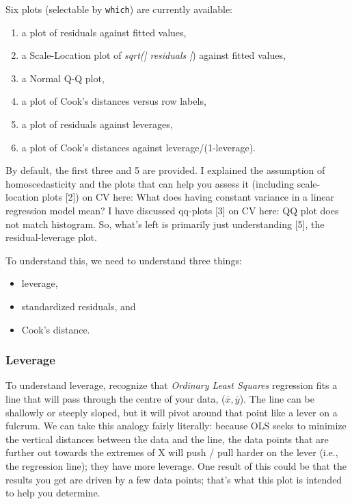 \documentclass[12pt, a4paper]{article}
\theoremstyle{plain}
\theoremstyle{definition}
\theoremstyle{remark}
\begin{document}
Six plots (selectable by \texttt{which}) are currently available: 
\begin{enumerate}
\item a plot of residuals against fitted values, 
\item a Scale-Location plot of \textit{sqrt(| residuals |}) against fitted values, 
\item a Normal Q-Q plot, 
\item a plot of Cook's distances versus row labels, 
\item a plot of residuals against leverages, 
\item a plot of Cook's distances against leverage/(1-leverage).
\end{enumerate} By default, the first three and 5 are provided.
\newpage
 I explained the assumption of homoscedasticity and the plots that can help you assess it (including scale-location plots [2]) on CV here: What does having constant variance in a linear regression model mean? I have discussed qq-plots [3] on CV here: QQ plot does not match histogram. So, what's left is primarily just understanding [5], the residual-leverage plot.

To understand this, we need to understand three things:

\begin{itemize}
\item leverage,
\item standardized residuals, and
\item Cook's distance.
\end{itemize}
\subsubsection{Leverage}
To understand leverage, recognize that \textit{Ordinary Least Squares} regression fits a line that will pass through the centre of your data, ($\bar{x}, \bar{y}$). The line can be shallowly or steeply sloped, but it will pivot around that point like a lever on a fulcrum. We can take this analogy fairly literally: because OLS seeks to minimize the vertical distances between the data and the line, the data points that are further out towards the extremes of X will push / pull harder on the lever (i.e., the regression line); they have more leverage. One result of this could be that the results you get are driven by a few data points; that's what this plot is intended to help you determine.
\end{document}
